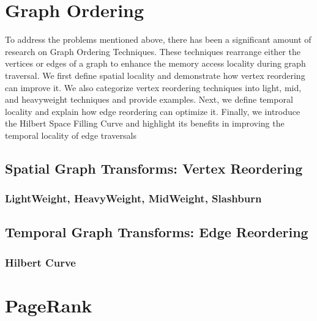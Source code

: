 \section{Graph Ordering}

To address the problems mentioned above, there has been a significant amount of research on Graph Ordering Techniques. These techniques rearrange either the vertices or edges of a graph to enhance the memory access locality during graph traversal. We first define spatial locality and demonstrate how vertex reordering can improve it. We also categorize vertex reordering techniques into light, mid, and heavyweight techniques and provide examples. Next, we define temporal locality and explain how edge reordering can optimize it. Finally, we introduce the Hilbert Space Filling Curve and highlight its benefits in improving the temporal locality of edge traversals

\subsection{Spatial Graph Transforms: Vertex Reordering}
\subsubsection{LightWeight, HeavyWeight, MidWeight, Slashburn}
\subsection{Temporal Graph Transforms: Edge Reordering}
\subsubsection{Hilbert Curve}

\section{PageRank}

